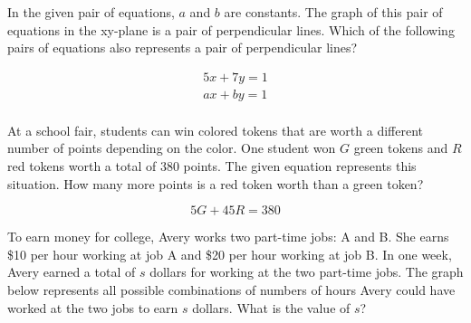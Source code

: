 \noindent\markforreview

\vspace{1em}

In the given pair of equations, \( a \) and \( b \) are constants. The graph of this pair of equations in the xy-plane is a pair of perpendicular lines. Which of the following pairs of equations also represents a pair of perpendicular lines?

\[
\begin{aligned}
5x + 7y = 1 \\
ax + by = 1 \\
\end{aligned}
\]

\vspace{0.75em}


\newpage

\noindent\markforreview

\vspace{1em}

At a school fair, students can win colored tokens that are worth a different number of points depending on the color. One student won \( G \) green tokens and \( R \) red tokens worth a total of 380 points. The given equation represents this situation. How many more points is a red token worth than a green token?

\[
5G + 45R = 380
\]

\vspace{2em}
\noindent\markforreview

\vspace{1em}

To earn money for college, Avery works two part-time jobs: A and B. She earns \$10 per hour working at job A and \$20 per hour working at job B. In one week, Avery earned a total of \( s \) dollars for working at the two part-time jobs. The graph below represents all possible combinations of numbers of hours Avery could have worked at the two jobs to earn \( s \) dollars. What is the value of \( s \)?

\begin{center}
\end{center}




